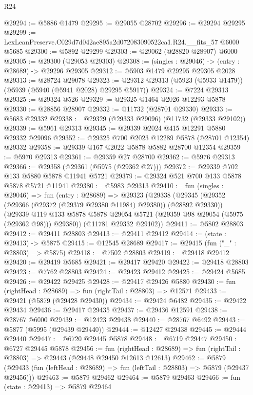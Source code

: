 \begin{lexlean}{R24}
\begin{coremodule}
@29294 := @5886 @1479
@29295 := @29055 @28702
@29296 := @29294 @29295
@29299 := LexLeanPreserve.C029d7d042ae895a2d072083090522ca1.R24.__fits_57 @6000 @5685
@29300 := @5892 @29299
@29303 := @29062 (@28820 @28907) @6000
@29305 := @29300 (@29053 @29303)
@29308 := (singles : @29046) -> (entry : @28689) -> @29296 @29305
@29312 := @5903 @1479 @29295 @29305 @2028
@29313 := @28724 @29078
@29323 := @29312 @29313 (@5923 (@5933 @1479)) (@5939 (@5940 (@5941 @2028) @29295 @5917))
@29324 := @7224 @29313
@29325 := @29324 @526
@29329 := @29325 @1464 @2026 @12293 @5878
@29330 := @28856 @28907
@29332 := @11732 (@28701 @29330)
@29333 := @5683 @29332
@29338 := @29329 (@29333 @29096) (@11732 (@29333 @29102))
@29339 := @5961 @29313
@29345 := @29339 @2024 @415 @12291 @5880 @29332 @29096
@29352 := @29325 @700 @2023 @12289 @5878 (@28701 @12354) @29332
@29358 := @29339 @167 @2022 @5878 @5882 @28700 @12354
@29359 := @5970 @29313
@29361 := @29359 @27 @28700
@29362 := @5976 @29313
@29366 := @29358 (@29361 (@5975 (@29362 @27)))
@29372 := @29339 @702 @133 @5880 @5878 @11941 @5721
@29379 := @29324 @521 @700 @133 @5878 @5878 @5721 @11941
@29380 := @5983 @29313
@29410 := fun (singles : @29046) =>
  fun (entry : @28689) =>
  @29323
    (@29338
      (@29345
        (@29352 (@29366 (@29372 (@29379 @29380 @11984) @29380)) (@28892 @29330))
        (@29339 @119 @133 @5878 @5878 @29054 @5721 (@29359 @98 @29054 (@5975 (@29362 @98))) @29380))
      (@11781 @29332 @29102))
@29411 := @5802 @28803
@29412 := @29411 @28803
@29413 := @29411 @29412
@29414 := (state : @29413) -> @5875
@29415 := @12545 @28689
@29417 := @29415 (fun ("_" : @28803) => @5875)
@29418 := @7502 @28803
@29419 := @29418 @29412
@29420 := @29419 @5685
@29421 := @29417 @29420
@29422 := @29418 @28803
@29423 := @7762 @28803
@29424 := @29423 @29412
@29425 := @29424 @5685
@29426 := @29422 @29425
@29428 := @29417 @29426 @5880
@29430 := fun (rightHead : @28689) => fun (rightTail : @28803) => @12571
@29433 := @29421 (@5879 (@29428 @29430))
@29434 := @29424 @6482
@29435 := @29422 @29434
@29436 := @29417 @29435
@29437 := @29436 @12591
@29438 := @28767 @6000
@29439 := @12423 @29438
@29440 := @28767 @6492
@29443 := @5877 (@5995 (@29439 @29440))
@29444 := @12427 @29438
@29445 := @29444 @29440
@29447 := @6720 @29445 @5878
@29448 := @6719 @29447
@29450 := @6727 @29445 @5878
@29456 := fun (rightHead : @28689) =>
  fun (rightTail : @28803) => @29443 (@29448 @29450 @12613 @12613)
@29462 := @5879
    (@29433 (fun (leftHead : @28689) => fun (leftTail : @28803) => @5879 (@29437 @29456)))
@29463 := @5879 @29462
@29464 := @5879 @29463
@29466 := fun (state : @29413) => @5879 @29464

\end{coremodule}
\end{lexlean}
